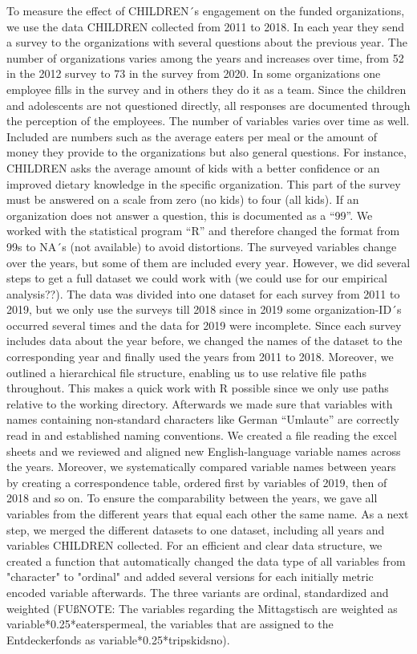\documentclass[12pt, a4paper, titlepage]{article}\usepackage[]{graphicx}\usepackage[]{color}
\begin{document}
To measure the effect of CHILDREN´s engagement on the funded organizations, we use the data CHILDREN collected from 2011 to 2018. In each year they send a survey to the organizations with several questions about the previous year. The number of organizations varies among the years and increases over time, from 52 in the 2012 survey to 73 in the survey from 2020. In some organizations one employee fills in the survey and in others they do it as a team. Since the children and adolescents are not questioned directly, all responses are documented through the perception of the employees. The number of variables varies over time as well. Included are numbers such as the average eaters per meal or the amount of money they provide to the organizations but also general questions. For instance, CHILDREN asks the average amount of kids with a better confidence or an improved dietary knowledge in the specific organization. This part of the survey must be answered on a scale from zero (no kids) to four (all kids). If an organization does not answer a question, this is documented as a “99”. We worked with the statistical program “R” and therefore changed the format from 99s to NA´s (not available) to avoid distortions. The surveyed variables change over the years, but some of them are included every year. 
However, we did several steps to get a full dataset we could work with (we could use for our empirical analysis??). The data was divided into one dataset for each survey from 2011 to 2019, but we only use the surveys till 2018 since in 2019 some organization-ID´s occurred several times and the data for 2019 were incomplete. Since each survey includes data about the year before, we changed the names of the dataset to the corresponding year and finally used the years from 2011 to 2018. Moreover, we outlined a hierarchical file structure, enabling us to use relative file paths throughout. This makes a quick work with R possible since we only use paths relative to the working directory. Afterwards we made sure that variables with names containing non-standard characters like German “Umlaute” are correctly read in and established naming conventions. We created a file reading the excel sheets and we reviewed and aligned new English-language variable names across the years. Moreover, we systematically compared variable names between years by creating a correspondence table, ordered first by variables of 2019, then of 2018 and so on. To ensure the comparability between the years, we gave all variables from the different years that equal each other the same name. As a next step, we merged the different datasets to one dataset, including all years and variables CHILDREN collected. For an efficient and clear data structure, we created a function that automatically changed the data type of all variables from "character" to "ordinal" and added several versions for each initially metric encoded variable afterwards. The three variants are ordinal, standardized and weighted (FUßNOTE: The variables regarding the Mittagstisch are weighted as variable*0.25*eaterspermeal, the variables that are assigned to the Entdeckerfonds as variable*0.25*tripskidsno). 
\end{document}
